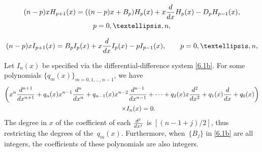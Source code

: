 \documentclass[10pt,a4paper]{amsart}
\begin{document}
\begin{gather}
(n - p) x H_{p+1}(x)
= ( (n - p) x + B_p ) H_p(x) + x {{\rm d} \over {\rm d}x} H_p(x) - D_p H_{p-1}(x), \nonumber\\
 p=0,\dots, n,\label{6.1a}
\end{gather}

\begin{equation}\label{6.1b}
 (n - p) x I_{p+1}(x)
= B_p I_p(x) + x {{\rm d} \over {\rm d}x} I_p(x) - p I_{p-1}(x), \qquad p=0,\dots, n,
\end{equation}

\begin{Proposition}\label{P3.3}
 Let $I_n(x)$ be specified via the differential-difference system
 \eqref{6.1b}. For some polynomials $\{ q_m(x) \}_{m=0,1,\dots,n-1}$, we have
 \begin{gather}
\left ( x^n {{\rm d}^{n+1} \over {\rm d} x^{n+1}} + q_n(x) x^{n-1} {{\rm d}^{n} \over {\rm d} x^{n}} + q_{n-1}(x) x^{n-2}{{\rm d}^{n-1} \over{\rm d} x^{n-1}}+ \cdots +
 q_2(x) x{{\rm d}^2 \over{\rm d} x^2}+
 q_1(x) {{\rm d} \over{\rm d} x} + q_0(x) \right )\nonumber\\
 \qquad\times
 I_n(x) =0.\label{MD3a2}
 \end{gather}
 The degree in $x$ of the coefficient of each
 ${{\rm d}^{j} \over{\rm d} x^{j}}$ is $[(n-1+j)/2]$, thus restricting the degrees of the~$q_m(x)$. Furthermore, when~$\{ B_j \}$
 {in \eqref{6.1b}}
 are all integers, the coefficients of these polynomials are also integers.
 \end{Proposition}
\end{document}
